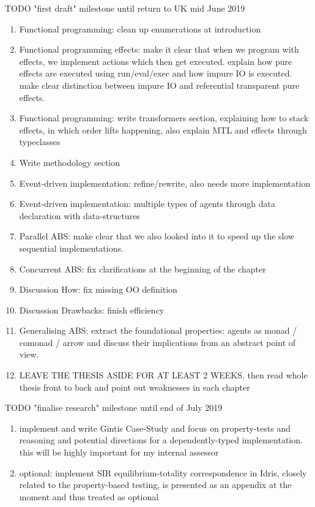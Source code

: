 \documentclass[oneside]{book}
\begin{document}
TODO "first draft" milestone until return to UK mid June 2019
\begin{enumerate}
	\item Functional programming: clean up enumerations at introduction
	\item Functional programming effects: make it clear that when we program with effects, we implement actions which then get executed. explain how pure effects are executed using run/eval/exec and how impure IO is executed. make clear distinction between impure IO and referential transparent pure effects. 
	\item Functional programming: write transformers section, explaining how to stack effects, in which order lifts happening, also explain MTL and effects through typeclasses
	\item Write methodology section
	\item Event-driven implementation: refine/rewrite, also needs more implementation
	\item Event-driven implementation: multiple types of agents through data declaration with data-structures
	\item Parallel ABS: make clear that we also looked into it to speed up the slow sequential implementations.
	\item Concurrent ABS: fix clarifications at the beginning of the chapter
	\item Discussion How: fix missing OO definition
	\item Discussion Drawbacks: finish efficiency
	
	\item Generalising ABS: extract the foundational properties: agents as monad / comonad / arrow and discuss their implications from an abstract point of view.
	
	\item LEAVE THE THESIS ASIDE FOR AT LEAST 2 WEEKS. then read whole thesis front to back and point out weaknesses in each chapter
\end{enumerate}

TODO "finalise research" milestone until end of July 2019
\begin{enumerate}
	\item implement and write Gintis Case-Study and focus on property-tests and reasoning and potential directions for a dependently-typed implementation. this will be highly important for my internal assessor 

	\item optional: implement SIR equilibrium-totality correspondence in Idris, closely related to the property-based testing, is presented as an appendix at the moment and thus treated as optional
\end{enumerate}
\end{document}
